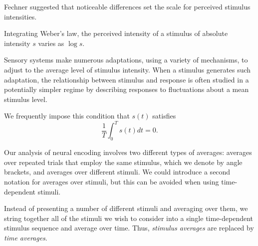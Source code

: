 \begin{rem}
  Fechner suggested that noticeable differences set the scale for perceived stimulus intensities.%
\end{rem}

\begin{prin}
  \label{prin:Fechner's law}
  Integrating Weber's law, the perceived intensity of a stimulus of absolute intensity $s$ varies as $\log{s}$.
\end{prin}

\begin{rem}
  Sensory systems make numerous adaptations, using a variety of mechanisms, to adjust to the average level of stimulus intensity. When a stimulus generates such adaptation, the relationship between stimulus and response is often studied in a potentially simpler regime by describing responses to fluctuations about a mean stimulus level. 
\end{rem}

\begin{asm}
  \label{defn:impose-s(t)-condition}
  We frequently impose this condition that $s(t)$ satisfies
  \begin{displaymath}
    \frac{1}{T}\int_0^T s(t) dt = 0.
  \end{displaymath}
\end{asm}

\begin{rem}
   Our analysis of neural encoding involves two different types of averages: averages over repeated trials that employ the same stimulus, which we denote by angle brackets, and averages over different stimuli. We could introduce a second notation for averages over stimuli, but this can be avoided when using time-dependent stimuli.
\end{rem}
\begin{ntn}%
  \label{defn:stimulus and time averages}
  Instead of presenting a number of different stimuli and averaging over them, we string together all of the stimuli we wish to consider into a single time-dependent stimulus sequence and average over time. Thus, \emph{stimulus averages} are replaced by \emph{time averages}.  
\end{ntn}


